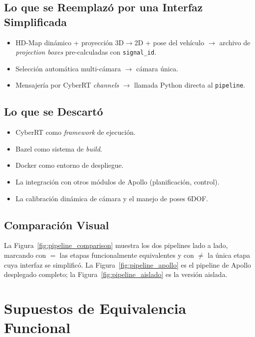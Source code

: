 \subsection{Lo que se Reemplazó por una Interfaz Simplificada}

\begin{itemize}
    \item HD-Map dinámico + proyección 3D$\to$2D + pose del vehículo $\to$ archivo de \textit{projection boxes} pre-calculadas con \texttt{signal\_id}.
    \item Selección automática multi-cámara $\to$ cámara única.
    \item Mensajería por CyberRT \textit{channels} $\to$ llamada Python directa al \texttt{pipeline}.
\end{itemize}

\subsection{Lo que se Descartó}

\begin{itemize}
    \item CyberRT como \textit{framework} de ejecución.
    \item Bazel como sistema de \textit{build}.
    \item Docker como entorno de despliegue.
    \item La integración con otros módulos de Apollo (planificación, control).
    \item La calibración dinámica de cámara y el manejo de poses 6DOF.
\end{itemize}

\subsection{Comparación Visual}

La Figura~\ref{fig:pipeline_comparison} muestra los dos pipelines lado a lado, marcando con $=$ las etapas funcionalmente equivalentes y con $\neq$ la única etapa cuya interfaz se simplificó. La Figura~\ref{fig:pipeline_apollo} es el pipeline de Apollo desplegado completo; la Figura~\ref{fig:pipeline_aislado} es la versión aislada.



\section{Supuestos de Equivalencia Funcional}
\label{sec:supuestos_equivalencia}


